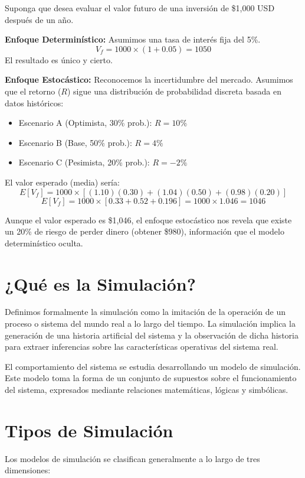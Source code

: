 \documentclass[11pt, letterpaper]{article}
\begin{document}
Suponga que desea evaluar el valor futuro de una inversión de \$1,000 USD después de un año.

\textbf{Enfoque Determinístico:}
Asumimos una tasa de interés fija del 5\%.
\[ V_f = 1000 \times (1 + 0.05) = 1050 \]
El resultado es único y cierto.

\textbf{Enfoque Estocástico:}
Reconocemos la incertidumbre del mercado. Asumimos que el retorno ($R$) sigue una distribución de probabilidad discreta basada en datos históricos:
\begin{itemize}
    \item Escenario A (Optimista, 30\% prob.): $R = 10\%$
    \item Escenario B (Base, 50\% prob.): $R = 4\%$
    \item Escenario C (Pesimista, 20\% prob.): $R = -2\%$
\end{itemize}

El valor esperado (media) sería:
\[ E[V_f] = 1000 \times [ (1.10)(0.30) + (1.04)(0.50) + (0.98)(0.20) ] \]
\[ E[V_f] = 1000 \times [ 0.33 + 0.52 + 0.196 ] = 1000 \times 1.046 = 1046 \]

Aunque el valor esperado es \$1,046, el enfoque estocástico nos revela que existe un 20\% de riesgo de perder dinero (obtener \$980), información que el modelo determinístico oculta.

\section{¿Qué es la Simulación?}

Definimos formalmente la simulación como la imitación de la operación de un proceso o sistema del mundo real a lo largo del tiempo. La simulación implica la generación de una historia artificial del sistema y la observación de dicha historia para extraer inferencias sobre las características operativas del sistema real.

El comportamiento del sistema se estudia desarrollando un modelo de simulación. Este modelo toma la forma de un conjunto de supuestos sobre el funcionamiento del sistema, expresados mediante relaciones matemáticas, lógicas y simbólicas.

\section{Tipos de Simulación}

Los modelos de simulación se clasifican generalmente a lo largo de tres dimensiones:
\end{document}
